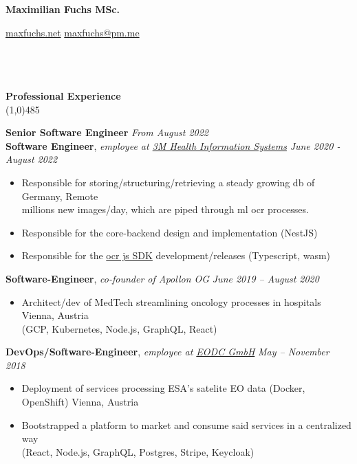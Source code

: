 \documentclass[9pt]{extarticle}
\newcommand\negativespace[1][-0.12cm]{\hspace*{#1}}
\begin{document}
\centerline{{\LARGE \bf Maximilian Fuchs MSc.}}
\centerline{\small \href{https://maxfuchs.net}{maxfuchs.net} \raisebox{0.25ex}{\tiny$\bullet$}  \href{mailto:maxfuchs@pm.me}{maxfuchs@pm.me}}


\noindent %
\\\\\\
\vspace*{-6pt}
{\negativespace \Large \bf Professional Experience}\\
\line(1,0){485}
\\
\noindent

\noindent
{\bf Senior Software Engineer}  \hfill \textit{From August 2022} \\
{\bf Software Engineer}, \textit{employee at \href{https://www.3m.com/3M/en_US/health-information-systems-us/support/international/}{3M Health Information Systems}}  \hfill \textit{June 2020 - August 2022} 
\begin{itemize}
\setlength\itemsep{0.05em}
\item Responsible for storing/structuring/retrieving a steady growing db of  \hfill Germany, Remote \\ 
millions new images/day, which are piped through ml ocr processes.
\item Responsible for the core-backend design and implementation (NestJS)
\item Responsible for the \href{https://github.com/Anyline/anyline-ocr-anylinejs-module}{ocr js SDK} development/releases (Typescript, wasm) \\
\end{itemize}

\noindent
{\bf Software-Engineer}, \textit{co-founder of Apollon OG}  \hfill \textit{June 2019 -- August 2020}
\begin{itemize}
\setlength\itemsep{0.05em}
\item Architect/dev of MedTech streamlining oncology processes in hospitals \hfill Vienna, Austria \\
(GCP, Kubernetes, Node.js, GraphQL, React) \\
\end{itemize}

\noindent
{\bf DevOps/Software-Engineer}, \textit{employee at \href{https://eodc.eu}{EODC GmbH}}  \hfill \textit{May -- November 2018}
\begin{itemize}
\setlength\itemsep{0.05em}
    \item Deployment of services processing ESA's satelite EO data (Docker, OpenShift) \hfill Vienna, Austria
    \item Bootstrapped a platform to market and consume said services in a centralized way \\
    (React, Node.js, GraphQL, Postgres, Stripe, Keycloak) \\
\end{itemize}
\end{document}
